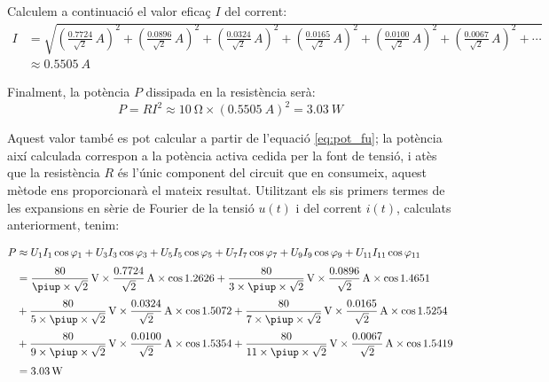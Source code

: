 \begin{exemple}
    Calculem a continuació el valor eficaç $I$ del corrent:
    \[\begin{split}
        I &= \sqrt{\left(\tfrac{\num{0,7724}}{\sqrt{2}}\unit{\,A}\right)^2 +
            \left(\tfrac{\num{0,0896}}{\sqrt{2}}\unit{\,A}\right)^2 +
            \left(\tfrac{\num{0,0324}}{\sqrt{2}}\unit{\,A}\right)^2 +
            \left(\tfrac{\num{0,0165}}{\sqrt{2}}\unit{\,A}\right)^2 +
            \left(\tfrac{\num{0,0100}}{\sqrt{2}}\unit{\,A}\right)^2 +
            \left(\tfrac{\num{0,0067}}{\sqrt{2}}\unit{\,A}\right)^2 + \cdots}
             \\[1ex]
            &\approx \qty{0,5505}{A}
    \end{split}\]

    Finalment, la potència $P$ dissipada en la resistència serà:
    \[
        P = R I^2 \approx \qty{10}{\ohm} \times (\qty{0,5505}{A})^2 =
        \qty{3,03}{W}
    \]

    Aquest valor també es pot calcular a partir de l'equació
    \eqref{eq:pot_fu}; la potència així calculada correspon a la
    potència activa cedida per la font de tensió, i atès que la
    resistència $R$ és l'únic component del circuit que en consumeix,
    aquest mètode ens proporcionarà el mateix resultat. Utilitzant els sis primers termes  de les
    expansions en sèrie de Fourier de la tensió $u(t)$ i del corrent
    $i(t)$, calculats anteriorment, tenim:

    \[\begin{split}
        P &\approx U_1 I_1 \cos\varphi_1 +  U_3 I_3 \cos\varphi_3 +
         U_5 I_5 \cos\varphi_5 + U_7 I_7 \cos\varphi_7 +
         U_9 I_9 \cos\varphi_9 + U_{11} I_{11} \cos\varphi_{11} \\[0.7ex]
        &= \frac{80}{\piup\times\sqrt{2}}\unit{\,V} \times
        \frac{\num{0,7724}}{\sqrt{2}}\unit{\,A} \times \cos \num{1,2626} +
        \frac{80}{3\times\piup\times\sqrt{2}}\unit{\,V} \times
        \frac{\num{0,0896}}{\sqrt{2}}\unit{\,A} \times \cos \num{1,4651}  \\[0.7ex]
        &+ \frac{80}{5\times\piup\times\sqrt{2}}\unit{\,V} \times
        \frac{\num{0,0324}}{\sqrt{2}}\unit{\,A} \times \cos \num{1,5072} +
        \frac{80}{7\times\piup\times\sqrt{2}}\unit{\,V} \times
        \frac{\num{0,0165}}{\sqrt{2}}\unit{\,A} \times \cos \num{1,5254} \\[0.7ex]
        &+ \frac{80}{9\times\piup\times\sqrt{2}}\unit{\,V} \times
        \frac{\num{0,0100}}{\sqrt{2}}\unit{\,A} \times \cos \num{1,5354} +
        \frac{80}{11\times\piup\times\sqrt{2}}\unit{\,V} \times
        \frac{\num{0,0067}}{\sqrt{2}}\unit{\,A} \times \cos \num{1,5419}\\[0.7ex]
        &= \qty{3,03}{W}
    \end{split}\]


\end{exemple}
